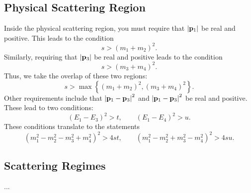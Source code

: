 \subsection{Physical Scattering Region}
Inside the physical scattering region, you must require that $\left\lvert \mathbf{p}_{1} \right\rvert$ be real and positive. This leads to the condition
\begin{equation}
	s > (m_{1} + m_{2})^{2}.
\end{equation}
Similarly, requiring that $\left\lvert \mathbf{p}_{3} \right\rvert$ be real and positive leads to the condition
\begin{equation}
	s > (m_{3} + m_{4})^{2}.
\end{equation}
Thus, we take the overlap of these two regions:
\begin{equation}
	s > \operatorname{max}{\left\lbrace (m_{1} + m_{2})^{2}, (m_{3} + m_{4})^{2} \right\rbrace}.
\end{equation}
Other requirements include that $\left\lvert  \mathbf{p}_{1} - \mathbf{p}_{3}  \right\rvert^{2}$ and $\left\lvert  \mathbf{p}_{1} - \mathbf{p}_{3}  \right\rvert^{2}$ be real and positive. These lead to two conditions:
\begin{equation}
	\left(E_{1} - E_{3} \right)^{2} > t, \qquad \left(E_{1} - E_{4} \right)^{2} > u.
\end{equation}
These conditions translate to the statements
\begin{equation}
	\left(m_{1}^{2} - m_{2}^{2} - m_{3}^{2} + m_{4}^{2} \right)^{2} > 4st, \qquad \left(m_{1}^{2} - m_{2}^{2} + m_{3}^{2} - m_{4}^{2} \right)^{2} > 4su.
\end{equation}
\subsection{Scattering Regimes}
...
